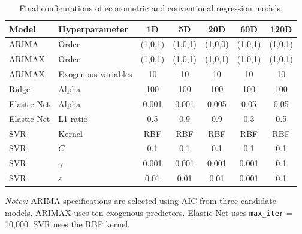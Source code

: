 \documentclass[12pt,twoside]{ord}
\begin{document}
\begin{table}[htbp]
\centering
\caption{Final configurations of econometric and conventional regression models.}\label{tab:config_econ_ml}
\setlength{\tabcolsep}{4.5pt}
\begin{tabular}{llccccc}
\hline
Model & Hyperparameter & 1D & 5D & 20D & 60D & 120D \\
\hline
ARIMA       & Order               & (1,0,1) & (1,0,1) & (1,0,0) & (1,0,1) & (1,0,1) \\
ARIMAX      & Order               & (1,0,1) & (1,0,1) & (1,0,1) & (1,0,1) & (1,0,1) \\
ARIMAX      & Exogenous variables & 10      & 10      & 10      & 10      & 10 \\
Ridge       & Alpha               & 100     & 100     & 100     & 100     & 100 \\
Elastic Net & Alpha               & 0.001   & 0.001   & 0.005   & 0.05    & 0.05 \\
Elastic Net & L1 ratio            & 0.5     & 0.9     & 0.9     & 0.3     & 0.5 \\
SVR         & Kernel              & RBF     & RBF     & RBF     & RBF     & RBF \\
SVR         & $C$                 & 0.1     & 0.1     & 0.1     & 0.1     & 0.1 \\
SVR         & $\gamma$            & 0.001   & 0.001   & 0.001   & 0.001   & 0.1 \\
SVR         & $\varepsilon$       & 0.01    & 0.01    & 0.01    & 0.001   & 0.1 \\
\hline
\end{tabular}
\par\vspace{4pt}\parbox{\linewidth}{\fontsize{9pt}{12pt}\selectfont\textit{Notes:} ARIMA specifications are selected using AIC from three candidate models. ARIMAX uses ten exogenous predictors. Elastic Net uses \texttt{max\_iter} = 10,000. SVR uses the RBF kernel.}
\end{table}
\end{document}
